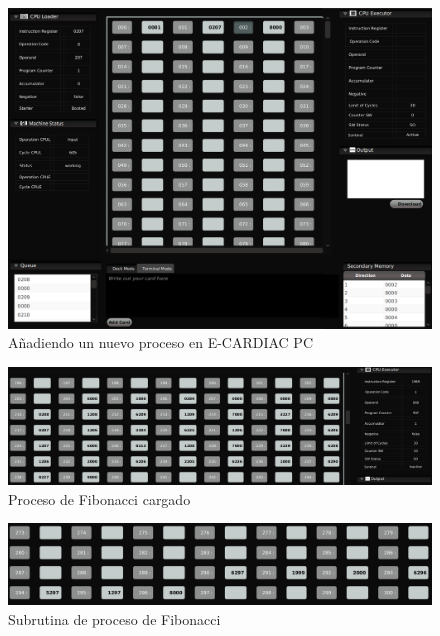 \documentclass[letterpaper,12pt,oneside]{book}
\begin{document}
	       \begin{figure}[h]		
				\centering
				\includegraphics[scale=0.47]{media/Paralela/vm_adding_new_process_fibonacci_cut.png}
				\caption{Añadiendo un nuevo proceso en E-CARDIAC PC}
				\label{fig:vm_adding_new_process_fibonacci}
			\end{figure}			
   
            \begin{figure}[H]		
				\centering
				\includegraphics[scale=0.38]{media/Paralela/vm_process_fibonacci_loaded_cut.png}
				\caption{Proceso de Fibonacci cargado}
				\label{fig:vm_process_fibonacci_loaded}
			\end{figure}
			
			\begin{figure}[H]		
				\centering
				\includegraphics[scale=0.35]{media/Paralela/vm_subrutine_fibonacci_cut.png}
				\caption{Subrutina de proceso de Fibonacci}
				\label{fig:vm_subrutine_fibonacci}
			\end{figure}
			
\end{document}
